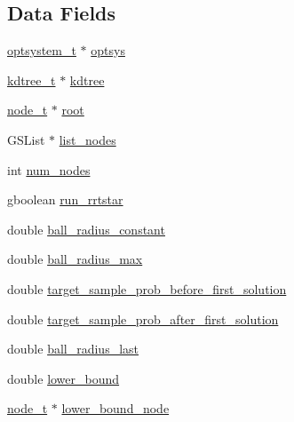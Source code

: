 \subsection*{\-Data \-Fields}
\begin{DoxyCompactItemize}
\item 
\hyperlink{a00018_a48d08bbb4534f55ba817743a2b91360c_a48d08bbb4534f55ba817743a2b91360c}{optsystem\-\_\-t} $\ast$ \hyperlink{a00005_ad2d3206cfaefa9f43659e35752c1fdc4_ad2d3206cfaefa9f43659e35752c1fdc4}{optsys}
\item 
\hyperlink{a00020_a3f2e3c0cbfdc70b2db1a09b9aa637a63_a3f2e3c0cbfdc70b2db1a09b9aa637a63}{kdtree\-\_\-t} $\ast$ \hyperlink{a00005_af7ad276e2c2777b487d51d0cfb1e3eba_af7ad276e2c2777b487d51d0cfb1e3eba}{kdtree}
\item 
\hyperlink{a00020_a9c3f304c1ae0687240efd69b7dc98cd6_a9c3f304c1ae0687240efd69b7dc98cd6}{node\-\_\-t} $\ast$ \hyperlink{a00005_a8998e6b3efac0d8d817e301e6522a95e_a8998e6b3efac0d8d817e301e6522a95e}{root}
\item 
\-G\-S\-List $\ast$ \hyperlink{a00005_a36bebfc997ea6923878f45c2ba02bb22_a36bebfc997ea6923878f45c2ba02bb22}{list\-\_\-nodes}
\item 
int \hyperlink{a00005_ae29617de649b665cf0d12c07b31c31d1_ae29617de649b665cf0d12c07b31c31d1}{num\-\_\-nodes}
\item 
gboolean \hyperlink{a00005_a30aad23453eb79f035ecd1fa82acf002_a30aad23453eb79f035ecd1fa82acf002}{run\-\_\-rrtstar}
\item 
double \hyperlink{a00005_a78004c6639270faa551ca8102a2f1a10_a78004c6639270faa551ca8102a2f1a10}{ball\-\_\-radius\-\_\-constant}
\item 
double \hyperlink{a00005_ad248f1aab9c69119356c269d592c4ae1_ad248f1aab9c69119356c269d592c4ae1}{ball\-\_\-radius\-\_\-max}
\item 
double \hyperlink{a00005_aec471f580f2a7649b67117cad9007e4a_aec471f580f2a7649b67117cad9007e4a}{target\-\_\-sample\-\_\-prob\-\_\-before\-\_\-first\-\_\-solution}
\item 
double \hyperlink{a00005_a39416738d060dfec64264e6c7178b8b5_a39416738d060dfec64264e6c7178b8b5}{target\-\_\-sample\-\_\-prob\-\_\-after\-\_\-first\-\_\-solution}
\item 
double \hyperlink{a00005_a8feca8c5101e18b5fdc56936afa01dec_a8feca8c5101e18b5fdc56936afa01dec}{ball\-\_\-radius\-\_\-last}
\item 
double \hyperlink{a00005_a1e2f9a2352c1d9a6cada9544898fceec_a1e2f9a2352c1d9a6cada9544898fceec}{lower\-\_\-bound}
\item 
\hyperlink{a00020_a9c3f304c1ae0687240efd69b7dc98cd6_a9c3f304c1ae0687240efd69b7dc98cd6}{node\-\_\-t} $\ast$ \hyperlink{a00005_ad3729166dd83f52a5e03e65a83eef6e7_ad3729166dd83f52a5e03e65a83eef6e7}{lower\-\_\-bound\-\_\-node}
\end{DoxyCompactItemize}


